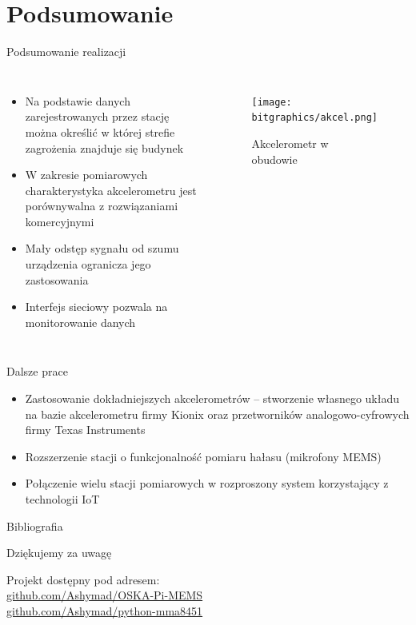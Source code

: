 \documentclass[aspectratio=1610,polish]{beamer} %
\begin{document}
  \section{Podsumowanie}
  \begin{frame}{Podsumowanie realizacji}
    \begin{columns}
      \begin{itemize}
        \item Na podstawie danych zarejestrowanych przez stację można określić w której strefie zagrożenia znajduje się budynek
        \item W zakresie pomiarowych charakterystyka akcelerometru jest porównywalna z rozwiązaniami komercyjnymi
        \item Mały odstęp sygnału od szumu urządzenia ogranicza jego zastosowania
        \item Interfejs sieciowy pozwala na monitorowanie danych
      \end{itemize}
      \begin{figure}
        \texttt{[image: bitgraphics/akcel.png]}
        \caption{Akcelerometr w obudowie}
      \end{figure}
    \end{columns} 
  \end{frame}
  \begin{frame}{Dalsze prace}
    \begin{itemize}
      \item Zastosowanie dokładniejszych akcelerometrów -- stworzenie własnego układu na bazie akcelerometru firmy Kionix oraz przetworników analogowo-cyfrowych firmy Texas Instruments
      \item Rozszerzenie stacji o funkcjonalność pomiaru hałasu (mikrofony MEMS)
      \item Połączenie wielu stacji pomiarowych w rozproszony system korzystający z technologii IoT
    \end{itemize}
  \end{frame}
  \begin{frame}{Bibliografia}
    \nocite{*}
    \printbibliography
  \end{frame}
  \begin{frame}
    \centering
    \vspace*{40pt}

    {\huge Dziękujemy za uwagę}
    \vspace*{20pt}

    Projekt dostępny pod adresem:\\
    \url{github.com/Ashymad/OSKA-Pi-MEMS}\\
    \url{github.com/Ashymad/python-mma8451}
  \end{frame}
\end{document}
